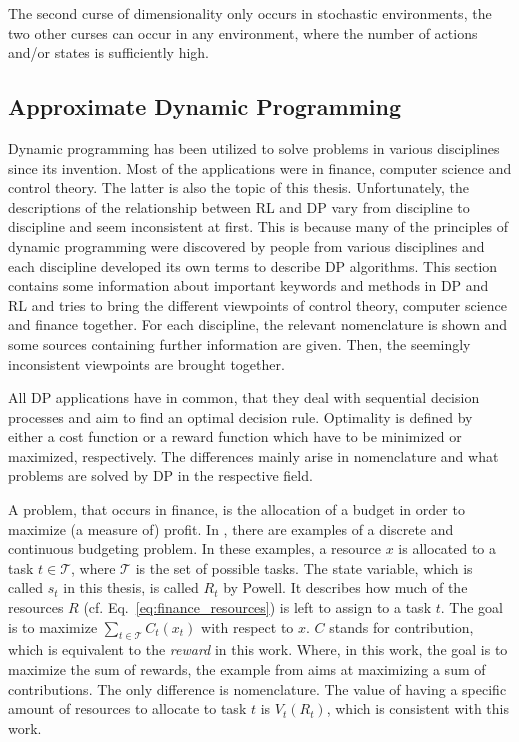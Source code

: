 The second curse of dimensionality only occurs in stochastic environments, the two other curses can occur in any environment, where the number of actions and/or states is sufficiently high.


\subsection{Approximate Dynamic Programming}

Dynamic programming has been utilized to solve problems in various disciplines since its invention. Most of the applications were in finance, computer science and control theory. The latter is also the topic of this thesis. Unfortunately, the descriptions of the relationship between RL and DP vary from discipline to discipline and seem inconsistent at first. This is because many of the principles of dynamic programming were discovered by people from various disciplines and each discipline developed its own terms to describe DP algorithms. This section contains some information about important keywords and methods in DP and RL and tries to bring the different viewpoints of control theory, computer science and finance together. For each discipline, the relevant nomenclature is shown and some sources containing further information are given. Then, the seemingly inconsistent viewpoints are brought together.

All DP applications have in common, that they deal with sequential decision processes and aim to find an optimal decision rule. Optimality is defined by either a cost function or a reward function which have to be minimized or maximized, respectively. The differences mainly arise in nomenclature and what problems are solved by DP in the respective field. \smallbreak

A problem, that occurs in finance, is the allocation of a budget in order to maximize (a measure of) profit. In \cite[section~2.1.2~f.]{Powell2007ADP}, there are examples of a discrete and continuous budgeting problem. In these examples, a resource $x$ is allocated to a task $t\in\mathcal{T}$, where $\mathcal{T}$ is the set of possible tasks. The state variable, which is called $s_t$ in this thesis, is called $R_t$ by Powell. It describes how much of the resources $R$ (cf. Eq.~\ref{eq:finance_resources}) is left to assign to a task $t$. The goal is to maximize $\sum_{t\in\mathcal{T}} C_t(x_t)$ with respect to $x$. $C$ stands for contribution, which is equivalent to the \textit{reward} in this work. Where, in this work, the goal is to maximize the sum of rewards, the example from \cite{Powell2007ADP} aims at maximizing a sum of contributions. The only difference is nomenclature. The value of having a specific amount of resources to allocate to task $t$ is $V_t(R_t)$, which is consistent with this work.

